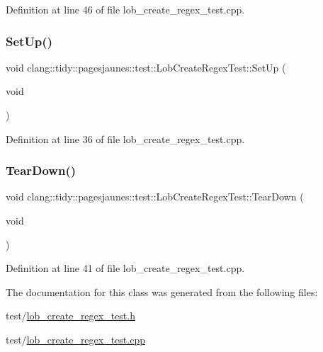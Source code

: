 Definition at line 46 of file lob\+\_\+create\+\_\+regex\+\_\+test.\+cpp.

\mbox{\label{classclang_1_1tidy_1_1pagesjaunes_1_1test_1_1_lob_create_regex_test_a8c0cd62e6ec6dec8758d7698c654101d}} 
\subsubsection{\texorpdfstring{Set\+Up()}{SetUp()}}
{\footnotesize\ttfamily void clang\+::tidy\+::pagesjaunes\+::test\+::\+Lob\+Create\+Regex\+Test\+::\+Set\+Up (\begin{DoxyParamCaption}\item[{void}]{ }\end{DoxyParamCaption})\hspace{0.3cm}{\ttfamily [virtual]}}



Definition at line 36 of file lob\+\_\+create\+\_\+regex\+\_\+test.\+cpp.

\mbox{\label{classclang_1_1tidy_1_1pagesjaunes_1_1test_1_1_lob_create_regex_test_af707b8015150c8ef157624b6543f8f2f}} 
\subsubsection{\texorpdfstring{Tear\+Down()}{TearDown()}}
{\footnotesize\ttfamily void clang\+::tidy\+::pagesjaunes\+::test\+::\+Lob\+Create\+Regex\+Test\+::\+Tear\+Down (\begin{DoxyParamCaption}\item[{void}]{ }\end{DoxyParamCaption})\hspace{0.3cm}{\ttfamily [virtual]}}



Definition at line 41 of file lob\+\_\+create\+\_\+regex\+\_\+test.\+cpp.



The documentation for this class was generated from the following files\+:\begin{DoxyCompactItemize}
\item 
test/\hyperlink{lob__create__regex__test_8h}{lob\+\_\+create\+\_\+regex\+\_\+test.\+h}\item 
test/\hyperlink{lob__create__regex__test_8cpp}{lob\+\_\+create\+\_\+regex\+\_\+test.\+cpp}\end{DoxyCompactItemize}
